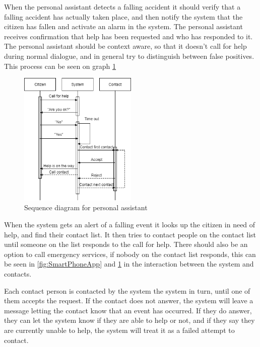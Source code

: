 When the personal assistant detects a falling accident it should verify that a falling accident has actually taken place, and then notify the system that the citizen has fallen and activate an alarm in the system. The personal assistant receives confirmation that help has been requested and who has responded to it. The personal assistant should be context aware, so that it doesn't call for help during normal dialogue, and in general try to distinguish between false positives. This process can be seen on graph \ref{fig:PersonAssitent}

\begin{figure}[H]
    \centering
    \includegraphics[width=0.5\textwidth]{Figures/PersonAssitent.png}
    \caption{Sequence diagram for personal assistant}
    \label{fig:PersonAssitent}
\end{figure}

When the system gets an alert of a falling event it looks up the citizen in need of help, and find their contact list. It then tries to contact people on the contact list until someone on the list responds to the call for help. There should also be an option to call emergency services, if nobody on the contact list responds, this can be seen in \ref{fig:SmartPhoneApp} and \ref{fig:PersonAssitent} in the interaction between the system and contacts.


Each contact person is contacted by the system the system in turn, until one of them accepts the request. If the contact does not answer, the system will leave a message letting the contact know that an event has occurred. If they do answer, they can let the system know if they are able to help or not, and if they say they are currently unable to help, the system will treat it as a failed attempt to contact.

